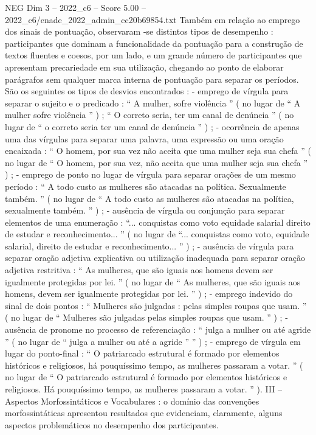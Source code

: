 \begin{textsample}{NEG Dim 3 – 2022\_c6 – Score 5.00 – 2022\_c6/enade\_2022\_admin\_cc20b69854.txt}
Também em relação ao emprego dos sinais de pontuação, observaram -se distintos tipos de desempenho : participantes que dominam a funcionalidade da pontuação para a construção de textos fluentes e coesos, por um lado, e um grande número de participantes que apresentam precariedade em sua utilização, chegando ao ponto de elaborar parágrafos sem qualquer marca interna de pontuação para separar os períodos.
São os seguintes os tipos de desvios encontrados : - emprego de vírgula para separar o sujeito e o predicado : “ A mulher, sofre violência ” ( no lugar de “ A mulher sofre violência ” ) ; “ O correto seria, ter um canal de denúncia ” ( no lugar de “ o correto seria ter um canal de denúncia ” ) ; - ocorrência de apenas uma das vírgulas para separar uma palavra, uma expressão ou uma oração encaixada : “ O homem, por sua vez não aceita que uma mulher seja sua chefa ” ( no lugar de “ O homem, por sua vez, não aceita que uma mulher seja sua chefa ” ) ; - emprego de ponto no lugar de vírgula para separar orações de um mesmo período : “ A todo custo as mulheres são atacadas na política.
Sexualmente também. ” ( no lugar de “ A todo custo as mulheres são atacadas na política, sexualmente também. ” ) ; - ausência de vírgula ou conjunção para separar elementos de uma enumeração : “... conquistas como voto equidade salarial direito de estudar e reconhecimento... ” ( no lugar de “... conquistas como voto, equidade salarial, direito de estudar e reconhecimento... ” ) ; - ausência de vírgula para separar oração adjetiva explicativa ou utilização inadequada para separar oração adjetiva restritiva : “ As mulheres, que são iguais aos homens devem ser igualmente protegidas por lei. ” ( no lugar de “ As mulheres, que são iguais aos homens, devem ser igualmente protegidas por lei. ” ) ; - emprego indevido do sinal de dois pontos : “ Mulheres são julgadas : pelas simples roupas que usam. ” ( no lugar de “ Mulheres são julgadas pelas simples roupas que usam. ” ) ; - ausência de pronome no processo de referenciação : “ julga a mulher ou até agride ” ( no lugar de “ julga a mulher ou até a agride ” ” ) ; - emprego de vírgula em lugar do ponto-final : “ O patriarcado estrutural é formado por elementos históricos e religiosos, há pouquíssimo tempo, as mulheres passaram a votar. ” ( no lugar de “ O patriarcado estrutural é formado por elementos históricos e religiosos.
Há pouquíssimo tempo, as mulheres passaram a votar. ” ).
III – Aspectos Morfossintáticos e Vocabulares : o domínio das convenções morfossintáticas apresentou resultados que evidenciam, claramente, alguns aspectos problemáticos no desempenho dos participantes.

\end{textsample}

